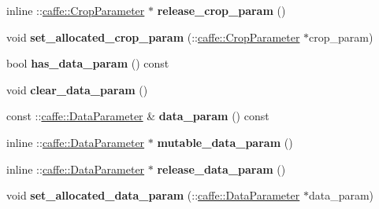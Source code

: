 \begin{DoxyCompactItemize}
inline \+::\mbox{\hyperlink{classcaffe_1_1_crop_parameter}{caffe\+::\+Crop\+Parameter}} $\ast$ {\bfseries release\+\_\+crop\+\_\+param} ()
\item 
\mbox{\label{classcaffe_1_1_layer_parameter_a590a2600a71df0867ec78be9bc3f83e5}} 
void {\bfseries set\+\_\+allocated\+\_\+crop\+\_\+param} (\+::\mbox{\hyperlink{classcaffe_1_1_crop_parameter}{caffe\+::\+Crop\+Parameter}} $\ast$crop\+\_\+param)
\item 
\mbox{\label{classcaffe_1_1_layer_parameter_a2f49bd89a6eecba346262547288c8738}} 
bool {\bfseries has\+\_\+data\+\_\+param} () const
\item 
\mbox{\label{classcaffe_1_1_layer_parameter_a4dce2f61f4afabd3f73da41f4100137c}} 
void {\bfseries clear\+\_\+data\+\_\+param} ()
\item 
\mbox{\label{classcaffe_1_1_layer_parameter_a317b7eee94d565429c9fa37baff0099d}} 
const \+::\mbox{\hyperlink{classcaffe_1_1_data_parameter}{caffe\+::\+Data\+Parameter}} \& {\bfseries data\+\_\+param} () const
\item 
\mbox{\label{classcaffe_1_1_layer_parameter_a9536a02e7e21de51450a40134450625f}} 
inline \+::\mbox{\hyperlink{classcaffe_1_1_data_parameter}{caffe\+::\+Data\+Parameter}} $\ast$ {\bfseries mutable\+\_\+data\+\_\+param} ()
\item 
\mbox{\label{classcaffe_1_1_layer_parameter_a74ff974e8881b5e3f9da9bb8b0b9e196}} 
inline \+::\mbox{\hyperlink{classcaffe_1_1_data_parameter}{caffe\+::\+Data\+Parameter}} $\ast$ {\bfseries release\+\_\+data\+\_\+param} ()
\item 
\mbox{\label{classcaffe_1_1_layer_parameter_a6411f0501708d9a523c4d8e122cbf3f3}} 
void {\bfseries set\+\_\+allocated\+\_\+data\+\_\+param} (\+::\mbox{\hyperlink{classcaffe_1_1_data_parameter}{caffe\+::\+Data\+Parameter}} $\ast$data\+\_\+param)
\item 
\mbox{\label{classcaffe_1_1_layer_parameter_a6d6c78ca20ce0cbd0ebc59bafe30aa70}} 

\end{DoxyCompactItemize}
